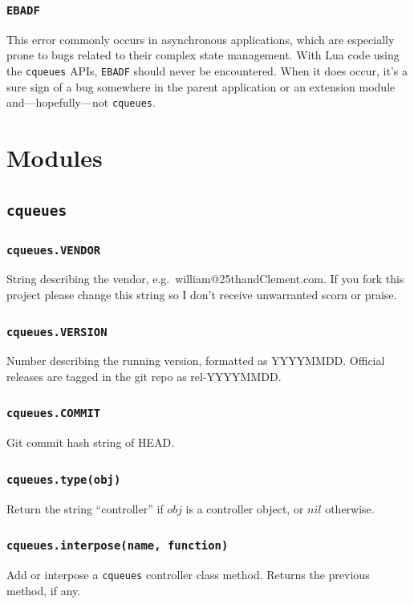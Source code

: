 \documentclass[11pt, oneside]{memoir}
\newcommand*{\cqueues}[0]{\texttt{cqueues}\xspace}
\newcommand*{\routine}[1]{\texttt{#1}\xspace}
\newcommand*{\errno}[1]{\texttt{#1}\xspace}
\newcounter{toccols}
\newenvironment{Module}[1]{
	\subsection{\texttt{#1}}
	\addtocontents{toc}{
		\protect\begin{multicols}{\value{toccols}}
	}
}{
	\addtocontents{toc}{\protect\end{multicols}}
}
\begin{document}
\subsubsection{\texttt{EBADF}}

This error commonly occurs in asynchronous applications, which are especially prone to bugs related to their complex state management. With Lua code using the \cqueues APIs, \errno{EBADF} should never be encountered. When it does occur, it's a sure sign of a bug somewhere in the parent application or an extension module and---hopefully---not \cqueues.

\section{Modules}

\begin{Module}{\cqueues}

\subsubsection{\routine{cqueues.VENDOR}}
String describing the vendor, e.g.\ william@25thandClement.com. If you fork this project please change this string so I don't receive unwarranted scorn or praise.

\subsubsection{\routine{cqueues.VERSION}}
Number describing the running version, formatted as YYYYMMDD. Official releases are tagged in the git repo as rel-YYYYMMDD.

\subsubsection{\routine{cqueues.COMMIT}}
Git commit hash string of HEAD.

\subsubsection[\routine{cqueues.type}]{\routine{cqueues.type(obj)}}
Return the string ``controller'' if $obj$ is a controller object, or $nil$ otherwise.

\subsubsection[\routine{cqueues.interpose}]{\routine{cqueues.interpose(name, function)}}
Add or interpose a \cqueues controller class method. Returns the previous method, if any.


\end{Module}
\end{document}
